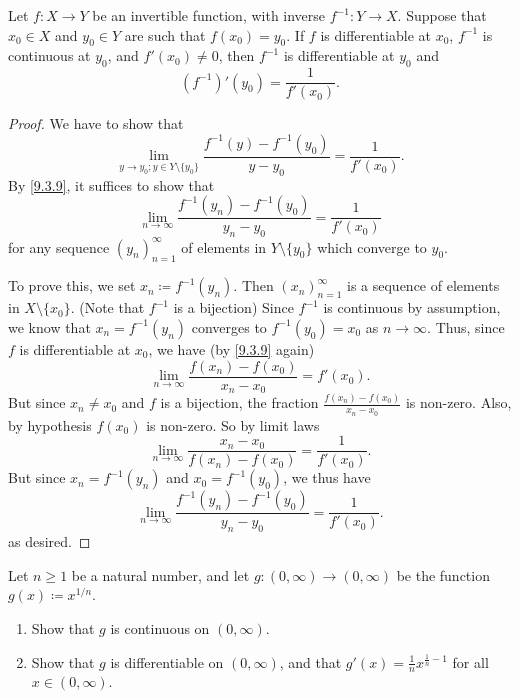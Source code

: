 \begin{theorem}\label{10.4.2}
  Let \(f : X \to Y\) be an invertible function, with inverse \(f^{-1} : Y \to X\).
  Suppose that \(x_0 \in X\) and \(y_0 \in Y\) are such that \(f(x_0) = y_0\).
  If \(f\) is differentiable at \(x_0\), \(f^{-1}\) is continuous at \(y_0\), and \(f'(x_0 ) \neq 0\), then \(f^{-1}\) is differentiable at \(y_0\) and
  \[
    (f^{-1})'(y_0) = \frac{1}{f'(x_0)}.
  \]
\end{theorem}

\begin{proof}
  We have to show that
  \[
    \lim_{y \to y_0 ; y \in Y \setminus \{y_0\}} \frac{f^{-1}(y) - f^{-1}(y_0)}{y - y_0} = \frac{1}{f'(x_0)}.
  \]
  By \cref{9.3.9}, it suffices to show that
  \[
    \lim_{n \to \infty} \frac{f^{-1}(y_n) - f^{-1}(y_0)}{y_n - y_0} = \frac{1}{f'(x_0)}
  \]
  for any sequence \((y_n)_{n = 1}^\infty\) of elements in \(Y \setminus \{y_0\}\) which converge to \(y_0\).

  To prove this, we set \(x_n \coloneqq f^{-1}(y_n)\).
  Then \((x_n)_{n = 1}^\infty\) is a sequence of elements in \(X \setminus \{x_0\}\).
  (Note that \(f^{-1}\) is a bijection)
  Since \(f^{-1}\) is continuous by assumption, we know that \(x_n = f^{-1}(y_n)\) converges to \(f^{-1}(y_0) = x_0\) as \(n \to \infty\).
  Thus, since \(f\) is differentiable at \(x_0\), we have (by \cref{9.3.9} again)
  \[
    \lim_{n \to \infty} \frac{f(x_n) - f(x_0)}{x_n - x_0} = f'(x_0).
  \]
  But since \(x_n \neq x_0\) and \(f\) is a bijection, the fraction \(\frac{f(x_n) - f(x_0)}{x_n - x_0}\) is non-zero.
  Also, by hypothesis \(f(x_0)\) is non-zero.
  So by limit laws
  \[
    \lim_{n \to \infty} \frac{x_n - x_0}{f(x_n) - f(x_0)} = \frac{1}{f'(x_0)}.
  \]
  But since \(x_n = f^{-1}(y_n)\) and \(x_0 = f^{-1}(y_0)\), we thus have
  \[
    \lim_{n \to \infty} \frac{f^{-1}(y_n) - f^{-1}(y_0)}{y_n - y_0} = \frac{1}{f'(x_0)}.
  \]
  as desired.
\end{proof}

\exercisesection

\begin{exercise}\label{ex 10.4.1}
  Let \(n \geq 1\) be a natural number, and let \(g : (0, \infty) \to (0, \infty)\) be the function \(g(x) \coloneqq x^{1 / n}\).
  \begin{enumerate}
    \item Show that \(g\) is continuous on \((0, \infty)\).
    \item Show that \(g\) is differentiable on \((0, \infty)\), and that \(g'(x) = \frac{1}{n} x^{\frac{1}{n} - 1}\) for all \(x \in (0, \infty)\).
  \end{enumerate}
\end{exercise}

